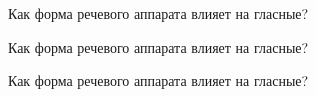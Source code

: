 \begin{frame}{Как форма речевого аппарата влияет на гласные?}
\Large
\vfill
\begin{center}
\begin{vowel}
\end{vowel}
\end{center}
\vfill
\end{frame}

\begin{frame}{Как форма речевого аппарата влияет на гласные?}
\Large
\vfill
\begin{center}
\begin{vowel}
\end{vowel}
\end{center}
\vfill
\end{frame}

\begin{frame}{Как форма речевого аппарата влияет на гласные?}
\Large
\vfill
\begin{center}
\begin{vowel}
\end{vowel}
\end{center}
\vfill
\end{frame}

